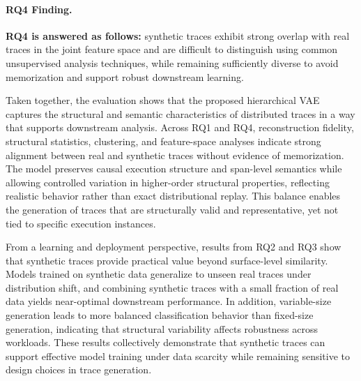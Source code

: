 \documentclass[sigconf,review]{acmart}
\begin{document}
\paragraph{RQ4 Finding.}
\textbf{RQ4 is answered as follows:} synthetic traces exhibit strong overlap with real traces in the joint feature space and are difficult to distinguish using common unsupervised analysis techniques, while remaining sufficiently diverse to avoid memorization and support robust downstream learning.

Taken together, the evaluation shows that the proposed hierarchical VAE captures the structural and semantic characteristics of distributed traces in a way that supports downstream analysis. Across RQ1 and RQ4, reconstruction fidelity, structural statistics, clustering, and feature-space analyses indicate strong alignment between real and synthetic traces without evidence of memorization. The model preserves causal execution structure and span-level semantics while allowing controlled variation in higher-order structural properties, reflecting realistic behavior rather than exact distributional replay. This balance enables the generation of traces that are structurally valid and representative, yet not tied to specific execution instances.

From a learning and deployment perspective, results from RQ2 and RQ3 show that synthetic traces provide practical value beyond surface-level similarity. Models trained on synthetic data generalize to unseen real traces under distribution shift, and combining synthetic traces with a small fraction of real data yields near-optimal downstream performance. In addition, variable-size generation leads to more balanced classification behavior than fixed-size generation, indicating that structural variability affects robustness across workloads. These results collectively demonstrate that synthetic traces can support effective model training under data scarcity while remaining sensitive to design choices in trace generation.


\end{document}
